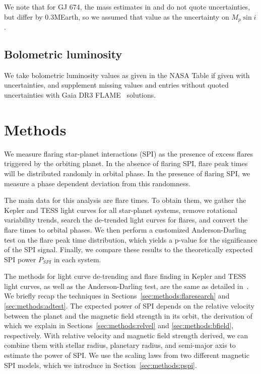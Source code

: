 \documentclass[twocolumn]{aastex631}
\begin{document}
We note that for GJ 674, the mass estimates in \cite{bonfils2007harps} and \cite{boisse2011disentangling} do not quote uncertainties, but differ by 0.3MEarth, so we assumed that value as the uncertainty on $M_p\sin i$.

\subsection{Bolometric luminosity}

We take bolometric luminosity values as given in the NASA Table if given with uncertainties, and supplement missing values and entries without quoted uncertainties with Gaia DR3 FLAME~\citep{fouesneau2022gaia} solutions. 

\section{Methods}
\label{sec:methods}
We measure flaring star-planet interactions (SPI) as the presence of excess flares triggered by the orbiting planet. In the absence of flaring SPI, flare peak times will be distributed randomly in orbital phase. In the presence of flaring SPI, we measure a phase dependent deviation from this randomness.

The main data for this analysis are flare times. To obtain them, we gather the Kepler and TESS light curves for all star-planet systems, remove rotational variability trends, search the de-trended light curves for flares, and convert the flare times to orbital phases. We then perform a customized Anderson-Darling test on the flare peak time distribution, which yields a p-value for the significance of the SPI signal. Finally, we compare these results to the theoretically expected SPI power $P_{SPI}$ in each system.

The methods for light curve de-trending and flare finding in Kepler and TESS light curves, as well as the Anderson-Darling test, are the same as detailed in~\citet{ilin2022searching}. We briefly recap the techniques in Sections~\ref{sec:methods:flaresearch} and \ref{sec:methods:adtest}. The expected power of SPI depends on the relative velocity between the planet and the magnetic field strength in its orbit, the derivation of which we explain in 
Sections~\ref{sec:methods:relvel} and \ref{sec:methods:bfield}, respectively. With relative velocity and magnetic field strength derived, we can combine them with stellar radius, planetary radius, and semi-major axis to estimate the power of SPI. We use the scaling laws from two different magnetic SPI models, which we introduce in Section~\ref{sec:methods:pspi}.
\end{document}
